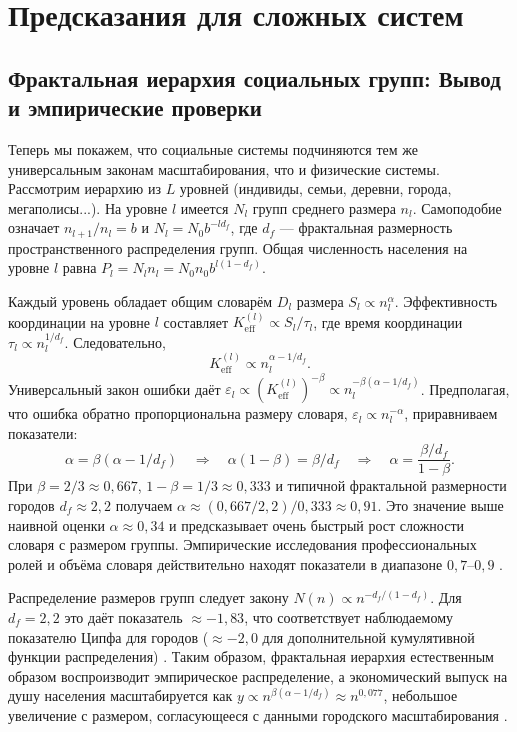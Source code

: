 \documentclass[11pt]{article}
\theoremstyle{remark}
\newcommand{\Keff}{K_{\mathrm{eff}}}
\begin{document}
	\section{Предсказания для сложных систем}
	\label{sec:predictions}
	
	\subsection{Фрактальная иерархия социальных групп: Вывод и эмпирические проверки}
	\label{sec:social_scaling}
	
	Теперь мы покажем, что социальные системы подчиняются тем же универсальным законам масштабирования, что и физические системы. Рассмотрим иерархию из \(L\) уровней (индивиды, семьи, деревни, города, мегаполисы...). На уровне \(l\) имеется \(N_l\) групп среднего размера \(n_l\). Самоподобие означает \(n_{l+1}/n_l = b\) и \(N_l = N_0 b^{-l d_f}\), где \(d_f\) — фрактальная размерность пространственного распределения групп. Общая численность населения на уровне \(l\) равна \(P_l = N_l n_l = N_0 n_0 b^{l(1-d_f)}\).
	
	Каждый уровень обладает общим словарём \(D_l\) размера \(S_l \propto n_l^{\alpha}\). Эффективность координации на уровне \(l\) составляет \(\Keff^{(l)} \propto S_l / \tau_l\), где время координации \(\tau_l \propto n_l^{1/d_f}\). Следовательно,
	\begin{equation}
		\Keff^{(l)} \propto n_l^{\alpha - 1/d_f}. \tag{1}
	\end{equation}
	Универсальный закон ошибки даёт \(\varepsilon_l \propto (\Keff^{(l)})^{-\beta} \propto n_l^{-\beta(\alpha - 1/d_f)}\). Предполагая, что ошибка обратно пропорциональна размеру словаря, \(\varepsilon_l \propto n_l^{-\alpha}\), приравниваем показатели:
	\begin{equation}
		\alpha = \beta(\alpha - 1/d_f) \quad\Longrightarrow\quad \alpha(1-\beta) = \beta / d_f \quad\Longrightarrow\quad \alpha = \frac{\beta / d_f}{1-\beta}.
	\end{equation}
	При \(\beta = 2/3 \approx 0,667\), \(1-\beta = 1/3 \approx 0,333\) и типичной фрактальной размерности городов \(d_f \approx 2,2\) получаем \(\alpha \approx (0,667/2,2)/0,333 \approx 0,91\). Это значение выше наивной оценки \(\alpha \approx 0,34\) и предсказывает очень быстрый рост сложности словаря с размером группы. Эмпирические исследования профессиональных ролей и объёма словаря действительно находят показатели в диапазоне \(0,7\)–\(0,9\) \cite{Bettencourt2007, Molinero2024}.
	
	Распределение размеров групп следует закону \(N(n) \propto n^{-d_f/(1-d_f)}\). Для \(d_f = 2,2\) это даёт показатель \(\approx -1,83\), что соответствует наблюдаемому показателю Ципфа для городов (\(\approx -2,0\) для дополнительной кумулятивной функции распределения) \cite{Fluschnik2016, Rybski2023}. Таким образом, фрактальная иерархия естественным образом воспроизводит эмпирическое распределение, а экономический выпуск на душу населения масштабируется как \(y \propto n^{\beta(\alpha - 1/d_f)} \approx n^{0,077}\), небольшое увеличение с размером, согласующееся с данными городского масштабирования \cite{Bettencourt2007}.
	
\end{document}
